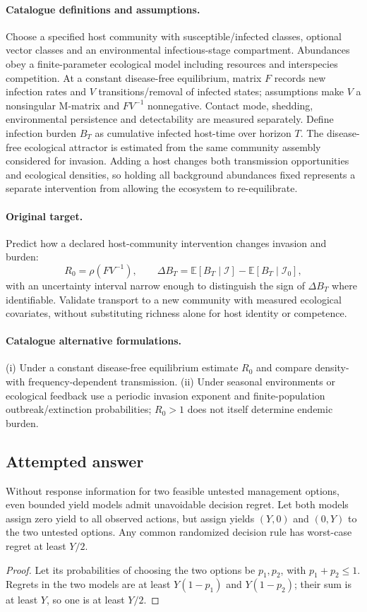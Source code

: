 \documentclass[11pt]{article}
\begin{document}
\paragraph{Catalogue definitions and assumptions.}
Choose a specified host community with susceptible/infected classes, optional vector classes and an environmental infectious-stage compartment. Abundances obey a finite-parameter ecological model including resources and interspecies competition. At a constant disease-free equilibrium, matrix $F$ records new infection rates and $V$ transitions/removal of infected states; assumptions make $V$ a nonsingular M-matrix and $FV^{-1}$ nonnegative. Contact mode, shedding, environmental persistence and detectability are measured separately. Define infection burden $B_T$ as cumulative infected host-time over horizon $T$. The disease-free ecological attractor is estimated from the same community assembly considered for invasion. Adding a host changes both transmission opportunities and ecological densities, so holding all background abundances fixed represents a separate intervention from allowing the ecosystem to re-equilibrate.
\paragraph{Original target.}
Predict how a declared host-community intervention changes invasion and burden:
\[
 R_0=\rho(FV^{-1}),\qquad
 \Delta B_T=\mathbb{E}[B_T\mid\mathcal I]-\mathbb{E}[B_T\mid\mathcal I_0],
\]
with an uncertainty interval narrow enough to distinguish the sign of $\Delta B_T$ where identifiable. Validate transport to a new community with measured ecological covariates, without substituting richness alone for host identity or competence.
\paragraph{Catalogue alternative formulations.}
(i) Under a constant disease-free equilibrium estimate $R_0$ and compare density- with frequency-dependent transmission. (ii) Under seasonal environments or ecological feedback use a periodic invasion exponent and finite-population outbreak/extinction probabilities; $R_0>1$ does not itself determine endemic burden.
\subsection{Attempted answer}
\begin{proposition}
Without response information for two feasible untested management options, even bounded yield models admit unavoidable decision regret. Let both models assign zero yield to all observed actions, but assign yields $(Y,0)$ and $(0,Y)$ to the two untested options. Any common randomized decision rule has worst-case regret at least $Y/2$.
\end{proposition}
\begin{proof}
Let its probabilities of choosing the two options be $p_1,p_2$, with $p_1+p_2\leq1$. Regrets in the two models are at least $Y(1-p_1)$ and $Y(1-p_2)$; their sum is at least $Y$, so one is at least $Y/2$.
\end{proof}
\end{document}
